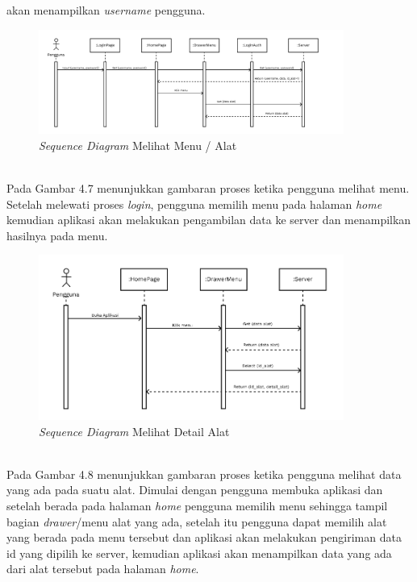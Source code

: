 \begin{flushleft}
\begin{justify}
\begin{enumerate}[label=\alph*.]
            akan menampilkan \emph{username} pengguna.\\
            \begin{figure}[ht]
                \centering
                \includegraphics[width=10cm]{images/bab 4/buka menu alat.png}
                \caption{\textit{Sequence Diagram} Melihat Menu / Alat}
            \end{figure}
            \\Pada Gambar 4.7 menunjukkan gambaran proses ketika pengguna melihat menu. Setelah melewati proses \emph{login}, pengguna memilih menu pada halaman \emph{home} kemudian aplikasi akan melakukan pengambilan data ke server dan menampilkan hasilnya pada menu.
            \begin{figure}[ht]
                \centering
                \includegraphics[width=10cm]{images/bab 4/Sequence buka detail alat.png}
                \caption{\textit{Sequence Diagram} Melihat Detail Alat}
            \end{figure}
            \\Pada Gambar 4.8 menunjukkan gambaran proses ketika pengguna melihat data yang ada pada suatu alat. Dimulai dengan pengguna membuka aplikasi dan setelah berada pada halaman \emph{home} pengguna memilih menu sehingga tampil bagian \emph{drawer}/menu alat yang ada, setelah itu pengguna dapat memilih alat yang berada pada menu tersebut dan aplikasi akan melakukan pengiriman data id yang dipilih ke server, 
            kemudian aplikasi akan menampilkan data yang ada dari alat tersebut pada halaman \emph{home}.
            \vspace{4cm}
            \begin{figure}[ht]

\end{figure}
\end{enumerate}
\end{justify}
\end{flushleft}
